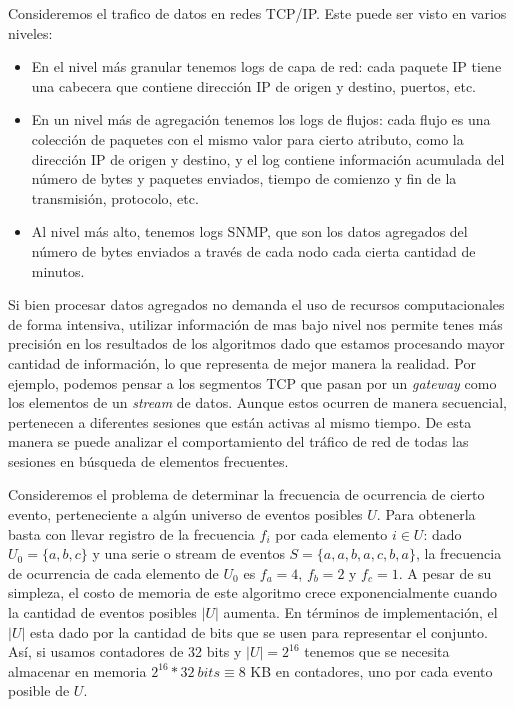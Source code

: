 \documentclass[a4paper,10pt, oneside]{article}
\begin{document}
Consideremos el trafico de datos en redes TCP/IP. Este puede ser visto en varios niveles:
\begin{itemize}
	\item En el nivel más granular tenemos logs de capa de red: cada paquete IP tiene una cabecera que contiene dirección IP de origen y destino, puertos, etc.
	\item En un nivel más de agregación tenemos los logs de flujos: cada flujo es una colección de paquetes con el mismo valor para cierto atributo, como la dirección IP de origen y destino, y el log contiene información acumulada del número de bytes y paquetes enviados, tiempo de comienzo y fin de la transmisión, protocolo, etc.
	\item Al nivel más alto, tenemos logs SNMP, que son los datos agregados del número de bytes enviados a través de cada nodo cada cierta cantidad de minutos.
\end{itemize}

Si bien procesar datos agregados no demanda el uso de recursos computacionales de forma intensiva, utilizar información de mas bajo nivel nos permite tenes más precisión en los resultados de los algoritmos dado que estamos procesando mayor cantidad de información, lo que representa de mejor manera la realidad. Por ejemplo, podemos pensar a los segmentos TCP que pasan por un \textit{gateway} como los elementos de un \textit{stream} de datos. Aunque estos ocurren de manera secuencial, pertenecen a diferentes sesiones que están activas al mismo tiempo. De esta manera se puede analizar el comportamiento del tráfico de red de todas las sesiones en búsqueda de elementos frecuentes.

Consideremos el problema de determinar la frecuencia de ocurrencia de cierto evento, perteneciente a algún universo de eventos posibles $U$. Para obtenerla basta con llevar registro de la frecuencia $f_i$ por cada elemento $i \in U$: dado $U_0=\{a,b,c\}$ y una serie o stream de eventos $S=\{a,a,b,a,c,b,a\}$, la frecuencia de ocurrencia de cada elemento de $U_0$ es $f_a=4$, $f_b=2$ y $f_c=1$.  A pesar de su simpleza, el costo de memoria de este algoritmo crece exponencialmente cuando la cantidad de eventos posibles $|U|$ aumenta. En términos de implementación, el $|U|$ esta dado por la cantidad de bits que se usen para representar el conjunto. Así, si usamos contadores de 32 bits y $|U|=2^{16}$ tenemos que se necesita almacenar en memoria $2^{16} * 32 \ bits\equiv 8$ KB en contadores, uno por cada evento posible de $U$. 
\end{document}
